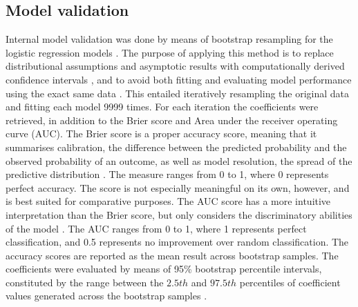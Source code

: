 \documentclass[12pt, a4paper]{article}
\begin{document}
\subsection{Model validation}
Internal model validation was done by means of bootstrap resampling for the logistic regression models \citep[][]{kvamme1988, verhagen2009}. The purpose of applying this method is to replace distributional assumptions and asymptotic results with computationally derived confidence intervals \citep[][605]{fox2008}, and to avoid both fitting and evaluating model performance using the exact same data \citep[][249--254]{hastie2009}. This entailed iteratively resampling the original data and fitting each model 9999 times. For each iteration the coefficients were retrieved, in addition to the Brier score and Area under the receiver operating curve (AUC). The Brier score is a proper accuracy score, meaning that it summarises calibration, the difference between the predicted probability and the observed probability of an outcome, as well as model resolution, the spread of the predictive distribution \citep{rufibach2010}. The measure ranges from 0 to 1, where 0 represents perfect accuracy. The score is not especially meaningful on its own, however, and is best suited for comparative purposes. The AUC score has a more intuitive interpretation than the Brier score, but only considers the discriminatory abilities of the model \citep[173--182]{hosmer2013}. The AUC ranges from 0 to 1, where 1 represents perfect classification, and 0.5 represents no improvement over random classification. The accuracy scores are reported as the mean result across bootstrap samples. The coefficients were evaluated by means of 95\% bootstrap percentile intervals, constituted by the range between the $2.5th$ and $97.5th$ percentiles of coefficient values generated across the bootstrap samples \citep[][595]{fox2008}.\par
\end{document}
